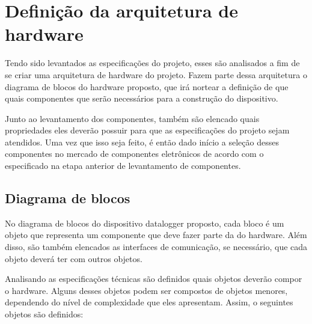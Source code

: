 \begin{enumerate}

    \end{enumerate}

\section{Definição da arquitetura de hardware}

Tendo sido levantados as especificações do projeto, esses são analisados a fim de se criar uma arquitetura de hardware do projeto. Fazem parte dessa arquitetura o diagrama de blocos do hardware proposto, que irá nortear a definição de que quais componentes que serão necessários para a construção do dispositivo. 

Junto ao levantamento dos componentes, também são elencado quais propriedades eles deverão possuir para que as especificações do projeto sejam atendidos. Uma vez que isso seja feito, é então dado início a seleção desses componentes no mercado de componentes eletrônicos de acordo com o especificado na etapa anterior de levantamento de componentes.

\subsection{Diagrama de blocos}

No diagrama de blocos do dispositivo datalogger proposto, cada bloco é um objeto que representa um componente que deve fazer parte da do hardware. Além disso, são também elencados as interfaces de comunicação, se necessário, que cada objeto deverá ter com outros objetos. 

Analisando as especificações técnicas são definidos quais objetos deverão compor  o hardware. Alguns desses objetos podem ser compostos de objetos menores, dependendo do nível de complexidade que eles apresentam. Assim, o seguintes objetos são definidos:

